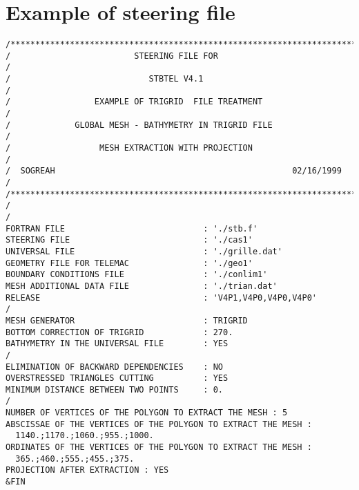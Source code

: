 \chapter{Example of steering file}

\begin{lstlisting}[language=TelemacCas]
/**********************************************************************/
/                         STEERING FILE FOR                            /
/                            STBTEL V4.1                               /
/                 EXAMPLE OF TRIGRID  FILE TREATMENT                   /
/             GLOBAL MESH - BATHYMETRY IN TRIGRID FILE                 /
/                  MESH EXTRACTION WITH PROJECTION                     /
/  SOGREAH                                                02/16/1999   /
/**********************************************************************/
/
/
FORTRAN FILE                            : './stb.f'
STEERING FILE                           : './cas1'
UNIVERSAL FILE                          : './grille.dat'
GEOMETRY FILE FOR TELEMAC               : './geo1'
BOUNDARY CONDITIONS FILE                : './conlim1'
MESH ADDITIONAL DATA FILE               : './trian.dat'
RELEASE                                 : 'V4P1,V4P0,V4P0,V4P0'
/
MESH GENERATOR                          : TRIGRID
BOTTOM CORRECTION OF TRIGRID            : 270.
BATHYMETRY IN THE UNIVERSAL FILE        : YES
/
ELIMINATION OF BACKWARD DEPENDENCIES    : NO
OVERSTRESSED TRIANGLES CUTTING          : YES
MINIMUM DISTANCE BETWEEN TWO POINTS     : 0.
/
NUMBER OF VERTICES OF THE POLYGON TO EXTRACT THE MESH : 5
ABSCISSAE OF THE VERTICES OF THE POLYGON TO EXTRACT THE MESH :
  1140.;1170.;1060.;955.;1000.
ORDINATES OF THE VERTICES OF THE POLYGON TO EXTRACT THE MESH :
  365.;460.;555.;455.;375.
PROJECTION AFTER EXTRACTION : YES
&FIN
\end{lstlisting}
